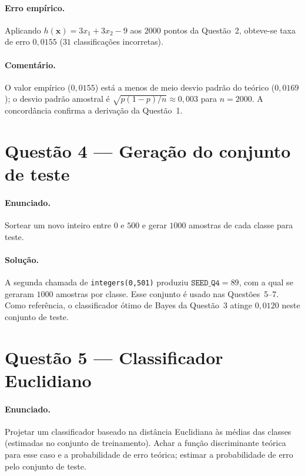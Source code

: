 ﻿\documentclass[12pt,a4paper]{article}
\begin{document}
\paragraph{Erro emp\'irico.} Aplicando $h(\mathbf{x})=3x_1+3x_2-9$ aos $2000$
pontos da Quest\~ao~2, obteve-se taxa de erro $0{,}0155$ ($31$
classifica\c{c}\~oes incorretas).

\paragraph{Coment\'ario.} O valor emp\'irico ($0{,}0155$) est\'a a menos
de meio desvio padr\~ao do te\'orico ($0{,}0169$); o desvio padr\~ao
amostral \'e $\sqrt{p(1-p)/n}\approx 0{,}003$ para $n=2000$. A
concord\^ancia confirma a deriva\c{c}\~ao da Quest\~ao~1.

\section*{Quest\~ao 4 --- Gera\c{c}\~ao do conjunto de teste}

\paragraph{Enunciado.} Sortear um novo inteiro entre $0$ e $500$ e
gerar $1000$ amostras de cada classe para teste.

\paragraph{Solu\c{c}\~ao.} A segunda chamada de
\texttt{integers(0,501)} produziu $\mathtt{SEED\_Q4}=89$, com a qual
se geraram $1000$ amostras por classe. Esse conjunto \'e usado nas
Quest\~oes~5--7. Como refer\^encia, o classificador \'otimo de Bayes da
Quest\~ao~3 atinge $0{,}0120$ neste conjunto de teste.

\section*{Quest\~ao 5 --- Classificador Euclidiano}

\paragraph{Enunciado.} Projetar um classificador baseado na dist\^ancia
Euclidiana \`as m\'edias das classes (estimadas no conjunto de
treinamento). Achar a fun\c{c}\~ao discriminante te\'orica para esse
caso e a probabilidade de erro te\'orica; estimar a probabilidade de
erro pelo conjunto de teste.
\end{document}
